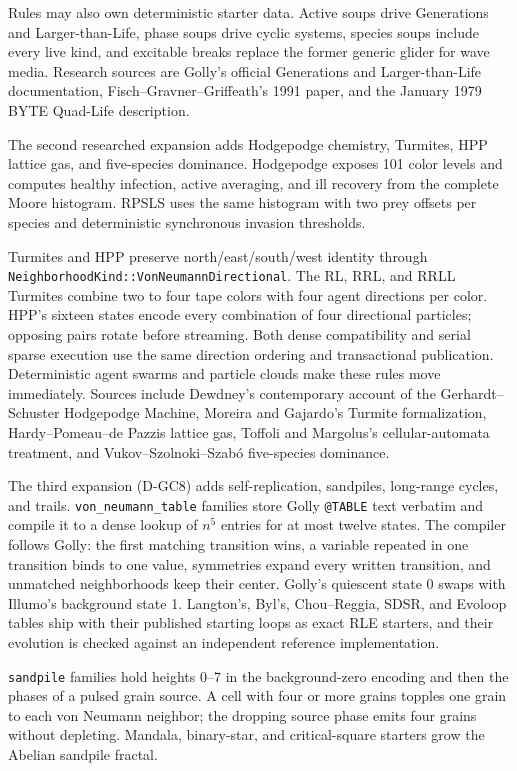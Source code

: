 Rules may also own deterministic starter data. Active soups drive Generations
and Larger-than-Life, phase soups drive cyclic systems, species soups include
every live kind, and excitable breaks replace the former generic glider for
wave media. Research sources are Golly's official Generations and
Larger-than-Life documentation, Fisch--Gravner--Griffeath's 1991 paper, and the
January 1979 BYTE Quad-Life description.

The second researched expansion adds Hodgepodge chemistry, Turmites, HPP
lattice gas, and five-species dominance. Hodgepodge exposes 101 color levels
and computes healthy infection, active averaging, and ill recovery from the
complete Moore histogram. RPSLS uses the same histogram with two prey offsets
per species and deterministic synchronous invasion thresholds.

Turmites and HPP preserve north/east/south/west identity through
\texttt{NeighborhoodKind::}\allowbreak\texttt{VonNeumannDirectional}.
The RL, RRL, and RRLL Turmites combine two to four tape colors with four agent
directions per color. HPP's sixteen states encode every combination of four
directional particles; opposing pairs rotate before streaming. Both dense
compatibility and serial sparse execution use the same direction ordering and
transactional publication. Deterministic agent swarms and particle clouds make
these rules move immediately. Sources include Dewdney's contemporary account
of the Gerhardt--Schuster Hodgepodge Machine, Moreira and Gajardo's Turmite
formalization, Hardy--Pomeau--de Pazzis lattice gas, Toffoli and Margolus's
cellular-automata treatment, and Vukov--Szolnoki--Szabó five-species dominance.

The third expansion (D-GC8) adds self-replication, sandpiles, long-range
cycles, and trails. \texttt{von\_neumann\_table} families store Golly
\texttt{@TABLE} text verbatim and compile it to a dense lookup of $n^5$
entries for at most twelve states. The compiler follows Golly: the first
matching transition wins, a variable repeated in one transition binds to one
value, symmetries expand every written transition, and unmatched
neighborhoods keep their center. Golly's quiescent state 0 swaps with Illumo's
background state 1. Langton's, Byl's, Chou--Reggia, SDSR, and Evoloop tables
ship with their published starting loops as exact RLE starters, and their
evolution is checked against an independent reference implementation.

\texttt{sandpile} families hold heights 0--7 in the background-zero encoding
and then the phases of a pulsed grain source. A cell with four or more grains
topples one grain to each von Neumann neighbor; the dropping source phase
emits four grains without depleting. Mandala, binary-star, and
critical-square starters grow the Abelian sandpile fractal.

